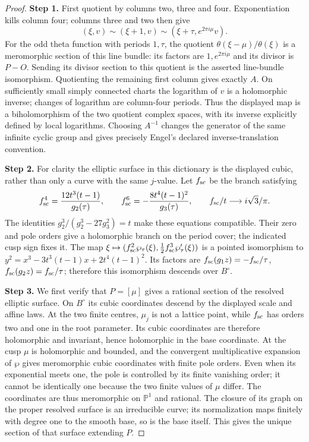 \documentclass[11pt,a4paper]{article}
\theoremstyle{plain}
\theoremstyle{definition}
\begin{document}
\begin{proof}
\par\smallskip\noindent\textbf{Step 1.} First quotient by columns two, three and four. Exponentiation kills column four; columns three and two then give
\[
 (\xi,v)\sim(\xi+1,v)\sim(\xi+\tau,e^{2\pi i\mu}v).
\]
For the odd theta function with periods $1,\tau$, the quotient $\theta(\xi-\mu)/\theta(\xi)$ is a meromorphic section of this line bundle: its factors are $1,e^{2\pi i\mu}$ and its divisor is $P-O$. Sending its divisor section to this quotient is the asserted line-bundle isomorphism. Quotienting the remaining first column gives exactly $A$. On sufficiently small simply connected charts the logarithm of $v$ is a holomorphic inverse; changes of logarithm are column-four periods. Thus the displayed map is a biholomorphism of the two quotient complex spaces, with its inverse explicitly defined by local logarithms. Choosing $A^{-1}$ changes the generator of the same infinite cyclic group and gives precisely Engel's declared inverse-translation convention.

\par\smallskip\noindent\textbf{Step 2.} For clarity the elliptic surface in this dictionary is the displayed cubic, rather than only a curve with the same $j$-value. Let $f_{\rm sc}$ be the branch satisfying
\[
 f_{\rm sc}^4=\frac{12t^3(t-1)}{g_2(\tau)},\qquad
 f_{\rm sc}^6=-\frac{8t^4(t-1)^2}{g_3(\tau)},\qquad
 f_{\rm sc}/t\longrightarrow i\sqrt3/\pi.
\]
The identities $g_2^3/(g_2^3-27g_3^2)=t$ make these equations compatible. Their zero and pole orders give a holomorphic branch on the period cover; the indicated cusp sign fixes it. The map $\xi\mapsto(f_{\rm sc}^2\wp_\tau(\xi),\frac12f_{\rm sc}^3\wp'_\tau(\xi))$ is a pointed isomorphism to
$y^2=x^3-3t^3(t-1)x+2t^4(t-1)^2$. Its factors are $f_{\rm sc}(g_1z)=-f_{\rm sc}/\tau$, $f_{\rm sc}(g_2z)=f_{\rm sc}/\tau$; therefore this isomorphism descends over $B^\circ$.

\par\smallskip\noindent\textbf{Step 3.} We first verify that $P=[\mu]$ gives a rational section of the resolved elliptic surface. On $B^\circ$ its cubic coordinates descend by the displayed scale and affine laws. At the two finite centres, $\mu_j$ is not a lattice point, while $f_{\rm sc}$ has orders two and one in the root parameter. Its cubic coordinates are therefore holomorphic and invariant, hence holomorphic in the base coordinate. At the cusp $\mu$ is holomorphic and bounded, and the convergent multiplicative expansion of $\wp$ gives meromorphic cubic coordinates with finite pole orders. Even when its exponential meets one, the pole is controlled by its finite vanishing order; it cannot be identically one because the two finite values of $\mu$ differ. The coordinates are thus meromorphic on $\mathbb P^1$ and rational. The closure of its graph on the proper resolved surface is an irreducible curve; its normalization maps finitely with degree one to the smooth base, so is the base itself. This gives the unique section of that surface extending $P$.


\end{proof}
\end{document}
